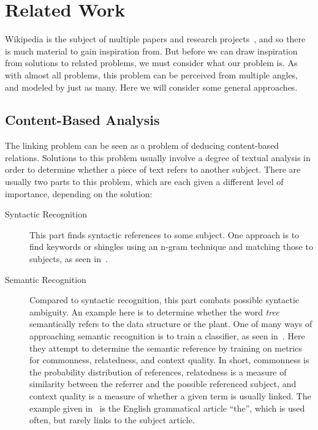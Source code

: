 \chapter{Related Work}\label{sec:related_work}
Wikipedia is the subject of multiple papers and research projects~\cite{wiki-research-newsletter}, and so there is much material to gain inspiration from. But before we can draw inspiration from solutions to related problems, we must consider what our problem is. As with almost all problems, this problem can be perceived from multiple angles, and modeled by just as many. Here we will consider some general approaches. 

\section{Content-Based Analysis}
\label{related_semantic_contextual}
The linking problem can be seen as a problem of deducing content-based relations. Solutions to this problem usually involve a degree of textual analysis in order to determine whether a piece of text refers to another subject. There are usually two parts to this problem, which are each given a different level of importance, depending on the solution:

\begin{description}
  \item[Syntactic Recognition] This part finds syntactic references to some subject. One approach is to find keywords or shingles using an n-gram technique and matching those to subjects, as seen in~\cite{mihalcea2007wikify}. 

  \item[Semantic Recognition] Compared to syntactic recognition, this part combats possible syntactic ambiguity. An example here is to determine whether the word \emph{tree} semantically refers to the data structure or the plant. One of many ways of approaching semantic recognition is to train a classifier, as seen in~\cite{milne2008learning}. Here they attempt to determine the semantic reference by training on metrics for commonness, relatedness, and context quality. In short, commonness is the probability distribution of references, relatedness is a measure of similarity between the referrer and the possible referenced subject, and context quality is a measure of whether a given term is usually linked. The example given in~\cite{milne2008learning} is the English grammatical article \enquote{the}, which is used often, but rarely links to the subject article.
\end{description}



